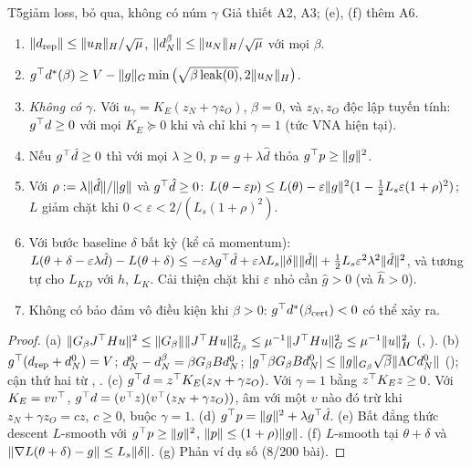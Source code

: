 \begin{namedthm}{T5}{giảm loss, bỏ qua, không có núm $\gamma$}
Giả thiết A2, A3; (e), (f) thêm A6.
\begin{enumerate}[label=(\alph*)]
\item $\lVert d_{\mathrm{rep}}\rVert\le\lVert u_R\rVert_H/\sqrt\mu$, $\lVert d_N^{\beta}\rVert\le\lVert u_N\rVert_H/\sqrt\mu$ với mọi $\beta$.
\item $g^{\top} d^*(\beta)\ge V-\lVert g\rVert_G\min\big(\sqrt{\beta\operatorname{leak}(0)},2\lVert u_N\rVert_H\big)$.
\item \emph{Không có $\gamma$.} Với $u_\gamma=K_E(z_N+\gamma z_O)$, $\beta=0$, và $z_N,z_O$ độc lập tuyến tính: $g^{\top} d\ge0$ với mọi $K_E\succeq0$ khi và chỉ khi $\gamma=1$ (tức VNA hiện tại).
\item Nếu $g^{\top}\hat d\ge0$ thì với mọi $\lambda\ge0$, $p=g+\lambda\hat d$ thỏa $g^{\top} p\ge\lVert g\rVert^2$.
\item Với $\rho:=\lambda\lVert \hat d\rVert/\lVert g\rVert$ và $g^{\top}\hat d\ge0$: $L(\theta-\varepsilon p)\le L(\theta)-\varepsilon\lVert g\rVert^2(1-\tfrac12L_s\varepsilon(1+\rho)^2)$; $L$ giảm chặt khi $0<\varepsilon<2/(L_s(1+\rho)^2)$.
\item Với bước baseline $\delta$ bất kỳ (kể cả momentum): $L(\theta+\delta-\varepsilon\lambda\hat d)-L(\theta+\delta)\le-\varepsilon\lambda g^{\top}\hat d+\varepsilon\lambda L_s\lVert \delta\rVert\lVert \hat d\rVert+\tfrac12L_s\varepsilon^2\lambda^2\lVert \hat d\rVert^2$, và tương tự cho $L_{KD}$ với $\hat h$, $L_K$. Cải thiện chặt khi $\varepsilon$ nhỏ cần $\hat g>0$ (và $\hat h>0$).
\item Không có bảo đảm vô điều kiện khi $\beta>0$: $g^{\top} d^*(\beta_{\mathrm{cert}})<0$ có thể xảy ra.
\end{enumerate}
\end{namedthm}
\begin{proof}
(a) $\lVert G_\beta J^{\top} Hu\rVert^2\le\lVert G_\beta\rVert\lVert J^{\top} Hu\rVert^2_{G_\beta}\le\mu^{-1}\lVert J^{\top} Hu\rVert_G^2\le\mu^{-1}\lVert u\rVert_H^2$ (, ).
(b) $g^{\top}(d_{\mathrm{rep}}+d_N^0)=V$; $d_N^0-d_N^{\beta}=\beta G_\beta Bd_N^0$; $|g^{\top}\beta G_\beta Bd_N^0|\le\lVert g\rVert_{G_\beta}\sqrt\beta\lVert \Lambda Cd_N^0\rVert$ (); cận thứ hai từ , .
(c) $g^{\top} d=z^{\top} K_E(z_N+\gamma z_O)$. Với $\gamma=1$ bằng $z^{\top} K_Ez\ge0$. Với $K_E=vv^{\top}$, $g^{\top} d=(v^{\top} z)(v^{\top}(z_N+\gamma z_O))$, âm với một $v$ nào đó trừ khi $z_N+\gamma z_O=cz$, $c\ge0$, buộc $\gamma=1$.
(d) $g^{\top} p=\lVert g\rVert^2+\lambda g^{\top}\hat d$.
(e) Bất đẳng thức descent $L$-smooth với $g^{\top} p\ge\lVert g\rVert^2$, $\lVert p\rVert\le(1+\rho)\lVert g\rVert$.
(f) $L$-smooth tại $\theta+\delta$ và $\lVert \nabla L(\theta+\delta)-g\rVert\le L_s\lVert \delta\rVert$.
(g) Phản ví dụ số (8/200 bài).
\end{proof}
